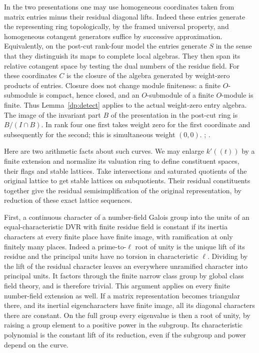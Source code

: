 In the two presentations one may use homogeneous coordinates taken
from matrix entries minus their residual diagonal lifts. Indeed these
entries generate the representing ring topologically, by the framed
universal property, and homogeneous cotangent generators suffice by
successive approximation. Equivalently, on the post-cut rank-four
model the entries generate \(S\) in the sense that they distinguish
its maps to complete local algebras. They then span its relative
cotangent space by testing the dual numbers of the residue field.
For these coordinates \(C\) is the closure of the algebra generated
by weight-zero products of entries. Closure does not change module
finiteness: a finite \(O\)-submodule is compact, hence closed, and
an \(O\)-submodule of a finite \(O\)-module is finite. Thus
Lemma~\ref{dp:detect} applies to the actual weight-zero entry algebra.
The image of the invariant part \(B\) of the presentation in the
post-cut ring is \(B/(I\cap B)\). In rank four one first takes
weight zero for the first coordinate and subsequently for the second;
this is simultaneous weight \((0,0)\).
;
.

Here are two arithmetic facts about such curves. We may enlarge
\(k'((t))\) by a finite extension and normalize its valuation ring
to define constituent spaces, their flags and stable lattices.
Take intersections and saturated quotients of the original lattice
to get stable lattices on subquotients. Their residual constituents
together give the residual semisimplification of the original
representation, by reduction of these exact lattice sequences.

First, a continuous character of a number-field Galois group into
the units of an equal-characteristic DVR with finite residue field
is constant if its inertia characters at every finite place have
finite image, with ramification at only finitely many places.
Indeed a prime-to-\(\ell\) root of unity is the unique lift of its
residue and the principal units have no torsion in characteristic
\(\ell\). Dividing by the lift of the residual character leaves an
everywhere unramified character into principal units. It factors
through the finite narrow class group by global class field theory,
and is therefore trivial. This argument applies on every finite
number-field extension as well. If a matrix representation becomes
triangular there, and its inertial eigencharacters have finite
image, all its diagonal characters there are constant. On the full
group every eigenvalue is then a root of unity, by raising a group
element to a positive power in the subgroup. Its characteristic
polynomial is the constant lift of its reduction, even if the
subgroup and power depend on the curve.

